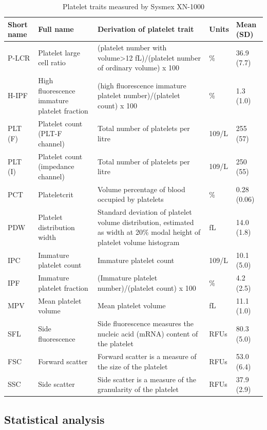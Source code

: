 \documentclass[11pt,twoside]{bristolthesis}
\begin{document}
\begin{landscape}\begin{table}

\caption[Platelet traits measured by Sysmex XN-1000]{\label{tab:Platelet-traits}Platelet traits measured by Sysmex XN-1000}
\centering
\begin{tabu} to 
\toprule
Short name & Full name & Derivation of platelet trait & Units & Mean (SD)\\
\midrule
P-LCR & Platelet large cell ratio & (platelet number with volume>12 fL)/(platelet number of ordinary volume)  x 100 & \% & 36.9 (7.7)\\
H-IPF & High fluorescence immature platelet fraction & (high fluorescence immature platelet number)/(platelet count)  x 100 & \% & 1.3 (1.0)\\
PLT (F) & Platelet count (PLT-F channel) & Total number of platelets per litre & 109/L & 255 (57)\\
PLT (I) & Platelet count (impedance channel) & Total number of platelets per litre & 109/L & 250 (55)\\
PCT & Plateletcrit & Volume percentage of blood occupied by platelets & \% & 0.28 (0.06)\\
\addlinespace
PDW & Platelet distribution width & Standard deviation of platelet volume distribution, estimated as width at 20\% modal height of platelet volume histogram & fL & 14.0 (1.8)\\
IPC & Immature platelet count & Immature platelet count & 109/L & 10.1 (5.0)\\
IPF & Immature platelet fraction & (Immature platelet number)/(platelet count)   x 100 & \% & 4.2 (2.5)\\
MPV & Mean platelet volume & Mean platelet volume & fL & 11.1 (1.0)\\
SFL & Side fluorescence & Side fluorescence measures the nucleic acid (mRNA) content of the platelet & RFUs & 80.3 (5.0)\\
\addlinespace
FSC & Forward scatter & Forward scatter is a measure of the size of the platelet & RFUs & 53.0 (6.4)\\
SSC & Side scatter & Side scatter is a measure of the granularity of the platelet & RFUs & 37.9 (2.9)\\
\bottomrule
\end{tabu}
\end{table}
\end{landscape}
\hypertarget{statistical-analysis-1}{%
\subsection{Statistical analysis}\label{statistical-analysis-1}}
\end{document}
